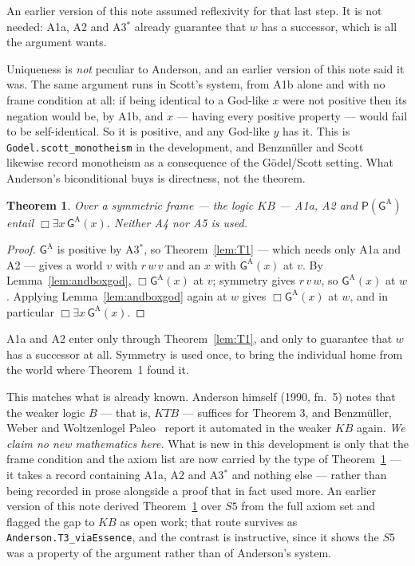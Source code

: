 \documentclass[11pt]{article}
\theoremstyle{plain}
\newtheorem{theorem}{Theorem}
\theoremstyle{definition}
\newcommand{\Gd}{\mathsf{G}}
\newcommand{\Pos}{\mathsf{P}}
\begin{document}
\noindent
An earlier version of this note assumed reflexivity for that last step. It is
not needed: A1a, A2 and A3$^{*}$ already guarantee that $w$ has a successor,
which is all the argument wants.

\noindent
Uniqueness is \emph{not} peculiar to Anderson, and an earlier version of this
note said it was. The same argument runs in Scott's system, from A1b alone and
with no frame condition at all: if being identical to a God-like $x$ were not
positive then its negation would be, by A1b, and $x$ --- having every positive
property --- would fail to be self-identical. So it is positive, and any
God-like $y$ has it. This is \verb|Godel.scott_monotheism| in the development,
and Benzm\"uller and Scott~\cite{bs2025} likewise record monotheism as a
consequence of the G\"odel/Scott setting. What Anderson's biconditional buys is
directness, not the theorem.

\begin{theorem}\label{thm:andT3}
Over a \emph{symmetric} frame --- the logic $KB$ --- A1a, A2 and
$\Pos(\Gd^{\mathrm{A}})$ entail $\Box\exists x\,\Gd^{\mathrm{A}}(x)$. Neither
A4 nor A5 is used.
\end{theorem}

\begin{proof}
$\Gd^{\mathrm{A}}$ is positive by A3$^{*}$, so Theorem~\ref{lem:T1} --- which
needs only A1a and A2 --- gives a world $v$ with $r\,w\,v$ and an $x$ with
$\Gd^{\mathrm{A}}(x)$ at $v$. By Lemma~\ref{lem:andboxgod},
$\Box\Gd^{\mathrm{A}}(x)$ at $v$; symmetry gives $r\,v\,w$, so
$\Gd^{\mathrm{A}}(x)$ at $w$. Applying Lemma~\ref{lem:andboxgod} again at $w$
gives $\Box\Gd^{\mathrm{A}}(x)$ at $w$, and in particular
$\Box\exists x\,\Gd^{\mathrm{A}}(x)$.
\end{proof}

\noindent
A1a and A2 enter only through Theorem~\ref{lem:T1}, and only to guarantee that
$w$ has a successor at all. Symmetry is used once, to bring the individual home
from the world where Theorem~1 found it.

This matches what is already known. Anderson himself (1990, fn.~5) notes that
the weaker logic $B$ --- that is, $KTB$ --- suffices for Theorem 3, and
Benzm\"uller, Weber and Woltzenlogel Paleo~\cite{bww2017} report it automated
in the weaker $KB$ again. \emph{We claim no new mathematics here.} What is new
in this development is only that the frame condition and the axiom list are now
carried by the type of Theorem~\ref{thm:andT3} --- it takes a record containing
A1a, A2 and A3$^{*}$ and nothing else --- rather than being recorded in prose
alongside a proof that in fact used more. An earlier version of this note
derived Theorem~\ref{thm:andT3} over $S5$ from the full axiom set and flagged
the gap to $KB$ as open work; that route survives as
\verb|Anderson.T3_viaEssence|, and the contrast is instructive, since it shows
the $S5$ was a property of the argument rather than of Anderson's system.
\end{document}
